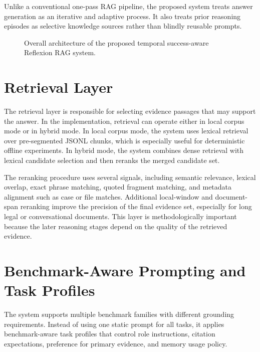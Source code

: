 Unlike a conventional one-pass RAG pipeline, the proposed system treats answer generation as an iterative and adaptive process. It also treats prior reasoning episodes as selective knowledge sources rather than blindly reusable prompts.

\begin{figure}[H]
    \centering
    
    \caption{Overall architecture of the proposed temporal success-aware Reflexion RAG system.}
    \label{fig:overall-architecture}
\end{figure}

\section{Retrieval Layer}
\label{sec:retrieval-layer}

The retrieval layer is responsible for selecting evidence passages that may support the answer. In the implementation, retrieval can operate either in local corpus mode or in hybrid mode. In local corpus mode, the system uses lexical retrieval over pre-segmented JSONL chunks, which is especially useful for deterministic offline experiments. In hybrid mode, the system combines dense retrieval with lexical candidate selection and then reranks the merged candidate set.

The reranking procedure uses several signals, including semantic relevance, lexical overlap, exact phrase matching, quoted fragment matching, and metadata alignment such as case or file matches. Additional local-window and document-span reranking improve the precision of the final evidence set, especially for long legal or conversational documents. This layer is methodologically important because the later reasoning stages depend on the quality of the retrieved evidence.


\section{Benchmark-Aware Prompting and Task Profiles}
\label{sec:benchmark-aware-prompting}

The system supports multiple benchmark families with different grounding requirements. Instead of using one static prompt for all tasks, it applies benchmark-aware task profiles that control role instructions, citation expectations, preference for primary evidence, and memory usage policy.


